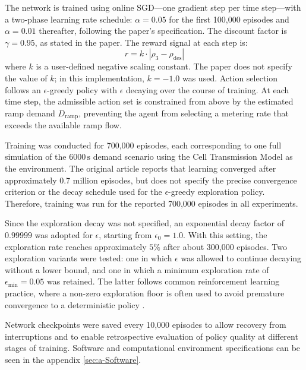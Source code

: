 The network is trained using online SGD---one gradient step per time step---with a two-phase learning rate schedule: $\alpha = 0.05$ for the first 100,000 episodes and $\alpha = 0.01$ thereafter, following the paper's specification. The discount factor is $\gamma = 0.95$, as stated in the paper. The reward signal at each step is:
\begin{equation}
    r = k \cdot |\rho_3 - \rho_{\mathrm{des}}|
\label{eq:reward_function}    
\end{equation} where $k$ is a user-defined negative scaling constant. The paper does not specify the value of $k$; in this implementation, $k = -1.0$ was used. Action selection follows an $\epsilon$-greedy policy with $\epsilon$ decaying over the course of training. At each time step, the admissible action set is constrained from above by the estimated ramp demand $D_{\mathrm{ramp}}$, preventing the agent from selecting a metering rate that exceeds the available ramp flow.

Training was conducted for 700,000 episodes, each corresponding to one full simulation of the $6000\,\mathrm{s}$ demand scenario using the Cell Transmission Model as the environment. The original article reports that
learning converged after approximately 0.7 million episodes, but does not
specify the precise convergence criterion or the decay schedule used for the
\(\epsilon\)-greedy exploration policy. Therefore, training was run for the
reported 700,000 episodes in all experiments.

Since the exploration decay was not specified, an exponential decay factor of
\(0.99999\) was adopted for \(\epsilon\), starting from
\(\epsilon_0 = 1.0\). With this setting, the exploration rate reaches
approximately \(5\%\) after about 300,000 episodes. Two exploration variants
were tested: one in which \(\epsilon\) was allowed to continue decaying without
a lower bound, and one in which a minimum exploration rate of
\(\epsilon_{\min}=0.05\) was retained. The latter follows common reinforcement
learning practice, where a non-zero exploration floor is often used to avoid
premature convergence to a deterministic policy \citep{EPSILON_GREEDY_CAP}.

 Network checkpoints were saved every 10,000 episodes to allow recovery from interruptions and to enable retrospective evaluation of policy quality at different stages of training. Software and computational environment specifications can be seen in the appendix \ref{sec:a-Software}.




